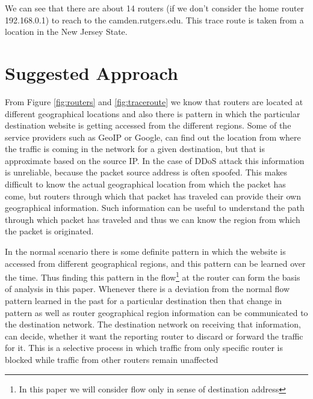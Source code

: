 \documentclass[10pt,oneside,a4paper]{article}
\begin{document}
We can see that there are about 14 routers (if we don't consider the home router 192.168.0.1) to reach to the camden.rutgers.edu. This trace route is taken from a location in the New Jersey State.\par

\section{Suggested Approach}

From Figure \ref{fig:routers} and \ref{fig:traceroute} we know that routers are located at different geographical locations and also there is pattern in which the particular destination website is getting accessed from the different regions. Some of the service providers such as  GeoIP or Google, can find out the location from where the traffic is coming in the network for a given destination, but that is approximate based on the source IP. In the case of DDoS attack this information is unreliable, because the packet source address is often spoofed. This makes difficult to know the actual geographical location from which the packet has come, but routers through which that packet has traveled can provide their own geographical information. Such information can be useful to understand the path through which packet has traveled and thus we can know the region from which the packet is originated.\par

In the normal scenario there is some definite pattern in which the website is accessed from different geographical regions, and this pattern can be learned over the time. Thus finding this pattern in the flow\footnote{In this paper we will consider flow only in sense of destination address} at the router can form the basis of analysis in this paper. Whenever there is a deviation from the normal flow pattern learned in the past for a particular destination then that change in pattern as well as router geographical region information can be communicated to the destination network. The destination network on receiving that information, can decide, whether it want the reporting router to discard or forward the traffic for it. This is a selective process in which traffic from only specific router is blocked while traffic from other routers remain unaffected\par
\end{document}
